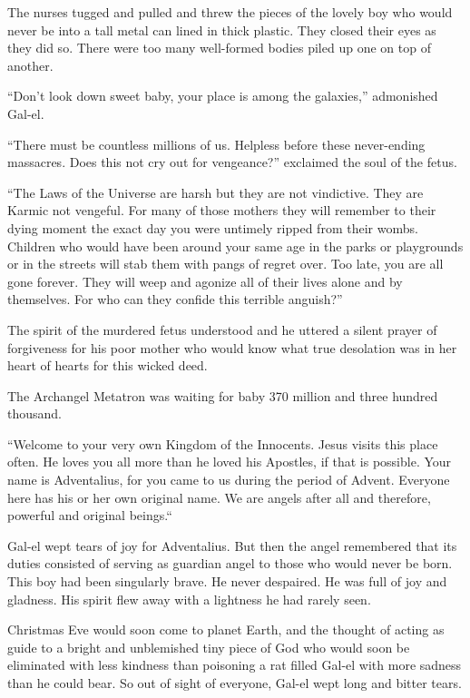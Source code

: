 The nurses tugged and pulled and threw the pieces of the lovely boy who would never be into a tall metal can lined in thick plastic. They closed their eyes as they did so. There were too many well-formed bodies piled up one on top of another.

``Don't look down sweet baby, your place is among the galaxies,'' admonished Gal-el.

``There must be countless millions of us. Helpless before these never-ending massacres. Does this not cry out for vengeance?'' exclaimed the soul of the fetus.

``The Laws of the Universe are harsh but they are not vindictive. They are Karmic not vengeful. For many of those mothers they will remember to their dying moment the exact day you were untimely ripped from their wombs. Children who would have been around your same age in the parks or playgrounds or in the streets will stab them with pangs of regret over. Too late, you are all gone forever. They will weep and agonize all of their lives alone and by themselves. For who can they confide this terrible anguish?''

The spirit of the murdered fetus understood and he uttered a silent prayer of forgiveness for his poor mother who would know what true desolation was in her heart of hearts for this wicked deed.

The Archangel Metatron was waiting for baby 370 million and three hundred thousand.

``Welcome to your very own Kingdom of the Innocents. Jesus visits this place often. He loves you all more than he loved his Apostles, if that is possible. Your name is Adventalius, for you came to us during the period of Advent. Everyone here has his or her own original name. We are angels after all and therefore, powerful and original beings.``

Gal-el wept tears of joy for Adventalius. But then the angel remembered that its duties consisted of serving as guardian angel to those who would never be born. This boy had been singularly brave. He never despaired. He was full of joy and gladness. His spirit flew away with a lightness he had rarely seen.

Christmas Eve would soon come to planet Earth, and the thought of acting as guide to a bright and unblemished tiny piece of God who would soon be eliminated with less kindness than poisoning a rat filled Gal-el with more sadness than he could bear. So out of sight of everyone, Gal-el wept long and bitter tears.


